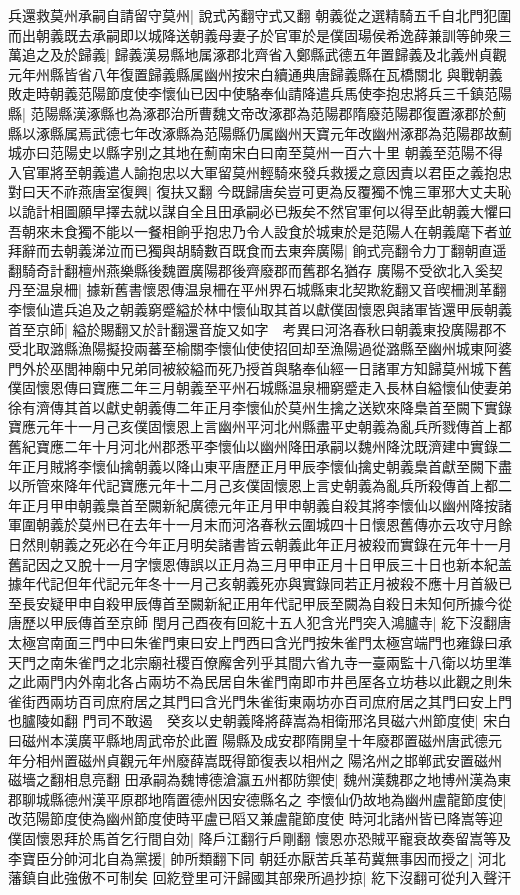 兵還救莫州承嗣自請留守莫州|{
	說式芮翻守式又翻}
朝義從之選精騎五千自北門犯圍而出朝義既去承嗣即以城降送朝義母妻子於官軍於是僕固瑒侯希逸薛兼訓等帥衆三萬追之及於歸義|{
	歸義漢易縣地属涿郡北齊省入鄭縣武德五年置歸義及北義州貞觀元年州縣皆省八年復置歸義縣属幽州按宋白續通典唐歸義縣在瓦橋關北}
與戰朝義敗走時朝義范陽節度使李懷仙已因中使駱奉仙請降遣兵馬使李抱忠將兵三千鎮范陽縣|{
	范陽縣漢涿縣也為涿郡治所曹魏文帝改涿郡為范陽郡隋廢范陽郡復置涿郡於薊縣以涿縣属焉武德七年改涿縣為范陽縣仍属幽州天寶元年改幽州涿郡為范陽郡故薊城亦曰范陽史以縣字别之其地在薊南宋白曰南至莫州一百六十里}
朝義至范陽不得入官軍將至朝義遣人諭抱忠以大軍留莫州輕騎來發兵救援之意因責以君臣之義抱忠對曰天不祚燕唐室復興|{
	復扶又翻}
今既歸唐矣豈可更為反覆獨不愧三軍邪大丈夫恥以詭計相圖願早擇去就以謀自全且田承嗣必已叛矣不然官軍何以得至此朝義大懼曰吾朝來未食獨不能以一餐相餉乎抱忠乃令人設食於城東於是范陽人在朝義麾下者並拜辭而去朝義涕泣而已獨與胡騎數百既食而去東奔廣陽|{
	餉式亮翻令力丁翻朝直遥翻騎奇計翻檀州燕樂縣後魏置廣陽郡後齊廢郡而舊郡名猶存}
廣陽不受欲北入奚契丹至温泉柵|{
	據新舊書懷恩傳温泉柵在平州界石城縣東北契欺紇翻又音喫柵測革翻}
李懷仙遣兵追及之朝義窮蹙縊於林中懷仙取其首以獻僕固懷恩與諸軍皆還甲辰朝義首至京師|{
	縊於賜翻又於計翻還音旋又如字　考異曰河洛春秋曰朝義東投廣陽郡不受北取潞縣漁陽擬投兩蕃至榆關李懷仙使使招回却至漁陽過從潞縣至幽州城東阿婆門外於巫閭神廟中兄弟同被絞縊而死乃授首與駱奉仙經一日諸軍方知歸莫州城下舊僕固懷恩傳曰寶應二年三月朝義至平州石城縣温泉柵窮蹙走入長林自縊懷仙使妻弟徐有濟傳其首以獻史朝義傳二年正月李懷仙於莫州生擒之送欵來降梟首至闕下實錄寶應元年十一月己亥僕固懷恩上言幽州平河北州縣盡平史朝義為亂兵所戮傳首上都舊紀寶應二年十月河北州郡悉平李懷仙以幽州降田承嗣以魏州降沈既濟建中實錄二年正月賊將李懷仙擒朝義以降山東平唐歷正月甲辰李懷仙擒史朝義梟首獻至闕下盡以所管來降年代記寶應元年十二月己亥僕固懷恩上言史朝義為亂兵所殺傳首上都二年正月甲申朝義梟首至闕新紀廣德元年正月甲申朝義自殺其將李懷仙以幽州降按諸軍圍朝義於莫州已在去年十一月末而河洛春秋云圍城四十日懷恩舊傳亦云攻守月餘日然則朝義之死必在今年正月明矣諸書皆云朝義此年正月被殺而實錄在元年十一月舊記因之又脫十一月字懷恩傳誤以正月為三月甲申正月十日甲辰三十日也新本紀盖據年代記但年代記元年冬十一月己亥朝義死亦與實錄同若正月被殺不應十月首級已至長安疑甲申自殺甲辰傳首至闕新紀正用年代記甲辰至闕為自殺日未知何所據今從唐歷以甲辰傳首至京師}
閏月己酉夜有回紇十五人犯含光門突入鴻臚寺|{
	紇下沒翻唐太極宫南面三門中曰朱雀門東曰安上門西曰含光門按朱雀門太極宫端門也雍錄曰承天門之南朱雀門之北宗廟社稷百僚廨舍列乎其間六省九寺一臺兩監十八衛以坊里準之此兩門内外南北各占兩坊不為民居自朱雀門南即市井邑厔各立坊巷以此觀之則朱雀街西兩坊百司庶府居之其門曰含光門朱雀街東兩坊亦百司庶府居之其門曰安上門也臚陵如翻}
門司不敢遏　癸亥以史朝義降將薛嵩為相衛邢洺貝磁六州節度使|{
	宋白曰磁州本漢廣平縣地周武帝於此置陽縣及成安郡隋開皇十年廢郡置磁州唐武德元年分相州置磁州貞觀元年州廢薛嵩既得節復表以相州之陽洺州之邯郸武安置磁州磁墻之翻相息亮翻}
田承嗣為魏博德滄瀛五州都防禦使|{
	魏州漢魏郡之地博州漢為東郡聊城縣德州漢平原郡地隋置德州因安德縣名之}
李懷仙仍故地為幽州盧龍節度使|{
	改范陽節度使為幽州節度使時平盧已䧟又兼盧龍節度使}
時河北諸州皆已降嵩等迎僕固懷恩拜於馬首乞行間自効|{
	降戶江翻行戶剛翻}
懷恩亦恐賊平寵衰故奏留嵩等及李寶臣分帥河北自為黨援|{
	帥所類翻下同}
朝廷亦厭苦兵革苟冀無事因而授之|{
	河北藩鎮自此強傲不可制矣}
回紇登里可汗歸國其部衆所過抄掠|{
	紇下沒翻可從刋入聲汗}


